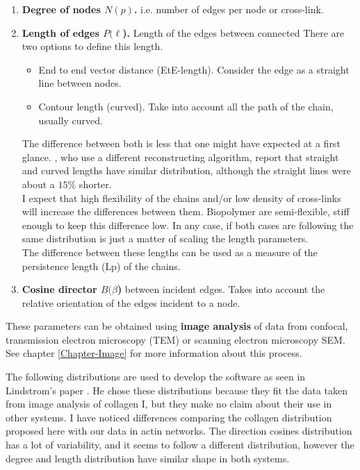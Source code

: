 \begin{enumerate}
\item \textbf{Degree of nodes $N(p)$.} i.e. number of edges per node
or cross-link.
\item \textbf{Length of edges $P(\ell$).} Length of the edges
between connected
There are two options to define this length.
\begin{itemize}
\item End to end vector distance (EtE-length). Consider the edge as a straight
line between nodes.

\item Contour length (curved). Take into account all the path of the chain,
usually curved.
\end{itemize}

The difference between both is less that one
might have expected at a first glance. \citet{nisslert_identification_2007},
who use a different reconstructing algorithm, report that straight and curved
lengths have similar distribution, although the straight lines were about a
$15\%$ shorter.\\
I expect that high flexibility of the chains and/or low density of cross-links
will increase the differences between them. Biopolymer are semi-flexible, stiff
enough to keep this difference low.
In any case, if both cases are following the same distribution is just a matter
of scaling the length parameters.\\
The difference between these lengths can be used as a measure of the
persistence length (\gls{Lp}) of the chains.


\item \textbf{Cosine director $B(\beta$)} between incident edges. Takes into
account the relative orientation of the edges incident to a node.


\end{enumerate}

These parameters can be obtained using \textbf{image analysis} of data from
\gls{confocal}, transmission electron microscopy (\gls{TEM}) or
scanning electron microscopy \gls{SEM}. See chapter \ref{Chapter-Image} for
more information about this process.

The following distributions are used to develop the software as seen in
Lindstrom's paper \citep{lindstrom_biopolymer_2010}. He chose these
distributions because they fit the data taken from image analysis of collagen I, but they make
no claim about their use in other systems. I have noticed differences comparing
 the collagen distribution proposed here with our data in actin networks. The
 direction cosines distribution has a lot of variability, and it seems to
 follow a different distribution, however the degree and length distribution
 have similar shape in both systems.


